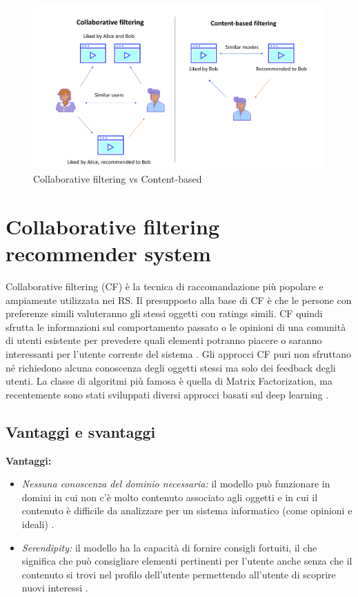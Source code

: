 \documentclass[12pt,italian]{report}
\begin{document}
\begin{figure}
  \includegraphics[width=\linewidth]{immagini/cb_cf_schema.png}
  \caption{Collaborative filtering vs Content-based}
  \label{fig:cb-cf}
\end{figure}

\section{Collaborative filtering recommender system}
Collaborative filtering (CF) è la tecnica di raccomandazione più popolare e ampiamente utilizzata nei RS. Il presupposto alla base di CF è che le persone con preferenze simili valuteranno gli stessi oggetti con ratings simili. CF quindi sfrutta le informazioni sul comportamento passato o le opinioni di una comunità di utenti esistente per prevedere quali elementi potranno piacere o saranno interessanti per l'utente corrente del sistema \cite{recsys-intro}. Gli approcci CF puri non sfruttano né richiedono alcuna conoscenza degli oggetti stessi ma solo dei feedback degli utenti. La classe di algoritmi più famosa è quella di Matrix Factorization, ma recentemente sono stati sviluppati diversi approcci basati sul deep learning \cite{deep-learning-survey}.

\subsection{Vantaggi e svantaggi} \label{ssec:pros-cons-cf}
\textbf{Vantaggi:}
\begin{itemize}

 \item \textit{Nessuna conoscenza del dominio necessaria:} il modello può funzionare in domini in cui non c'è molto contenuto associato agli oggetti e in cui il contenuto è difficile da analizzare per un sistema informatico (come opinioni e ideali) \cite{recsys-principle-methods-evaluation}.
 
 \item \textit{Serendipity:} il modello ha la capacità di fornire consigli fortuiti, il che significa che può consigliare elementi pertinenti per l'utente anche senza che il contenuto si trovi nel profilo dell'utente permettendo all'utente di scoprire nuovi interessi \cite{recsys-principle-methods-evaluation} \cite{cf-advantages-google}.
\end{itemize}
\end{document}
